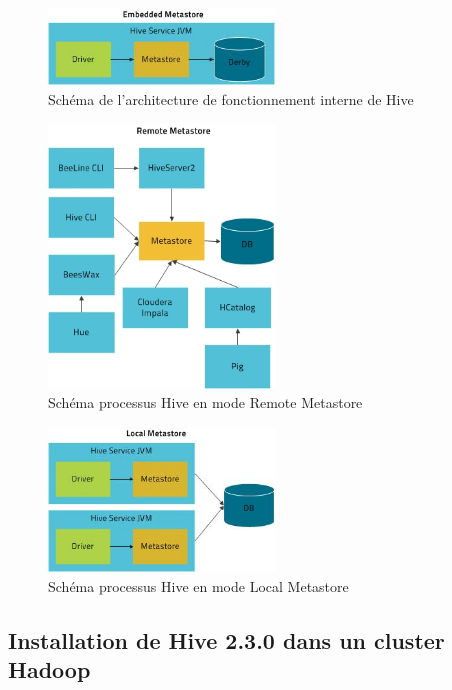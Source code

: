 \documentclass[12pt,french]{book}
\begin{document}
\begin{figure}[H]
	\centering
	\includegraphics[width=6cm]{hiveEmbeddedMetaStore}
	\caption[Schéma processus Hive en mode Embedded Metastore]{Schéma de l'architecture de fonctionnement interne de Hive \footnotemark}
\end{figure}



\begin{figure}[H]
	\centering
	\includegraphics[width=6cm]{hiveRemoteMetaStore}
	\caption[Schéma processus Hive en mode Remote Metastore]{Schéma processus Hive en mode Remote Metastore}
\end{figure}

\begin{figure}[H]
	\centering
	\includegraphics[width=6cm]{hiveLocalMetaStore}
	\caption[Schéma processus Hive en mode Local Metastore]{Schéma processus Hive en mode Local Metastore}
\end{figure}

\subsection{Installation de Hive 2.3.0 dans un cluster Hadoop}
\end{document}

